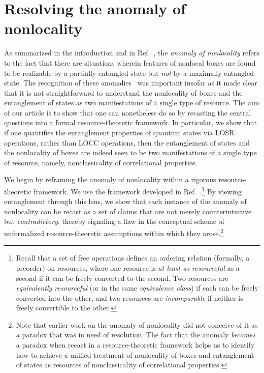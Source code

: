 \documentclass[12pt]{article}
\theoremstyle{plain}
\theoremstyle{definition}
\begin{document}
\section{Resolving the anomaly of nonlocality}\label{sec:anomalies}

As summarized in the introduction and in Ref.~\cite{Methot2006anomaly}, the {\em anomaly of nonlocality} refers to the fact that there are situations wherein features of nonlocal boxes are found to be realizable by a partially entangled state but {\em not} by a maximally entangled state. 
The recognition of these anomalies~\cite{Methot2006anomaly,AnomalyExtra2005Scarani,AnomalyExtra2008Brunner,vidick2011more,AnomalyExtra2011Junge,Acin2012randomnessvsnonlocality,AnomalyExtra2014Tan,AnomalyExtra2015Augusiak,AnomalyExtra2015Fonseca,AnomalyExtra2016Bowles,AnomalyExtra2017Kabel,AnomalyExtra2018Curchod,AnomalyExtra2018Bamps,AnomalyExtra2018Chitambar,AnomalyExtra2018Lipinska,AnomalyExtra2018Barasinski} was important insofar as it made clear that it is not straightforward to understand the nonlocality of boxes and the entanglement of states as two manifestations of a single type of resource.  The aim of our article is to show that one can nonetheless do so by recasting the central questions into a  formal resource-theoretic framework.  In particular, we show that if one quantifies the entanglement properties of quantum states via LOSR operations, rather than LOCC operations, then the entanglement of states and the nonlocality of boxes are indeed seen to be two manifestations of a single type of resource, namely, nonclassicality of correlational properties. 
  


We begin by reframing the anomaly of nonlocality within a rigorous resource-theoretic framework. 
We use the framework developed in Ref.~\cite{coecke2016mathematical}.\footnote{Recall that a set of free operations defines an ordering relation (formally, a preorder) on resources, where one resource is {\em at least as resourceful} as a second if it can be freely converted to the second. Two resources are {\em equivalently resourceful} (or in the same {\em equivalence class}) if each can be freely converted into the other, and two resources are {\em incomparable} 
 if neither is freely convertible to the other. } 
By viewing entanglement through this lens, we show that each instance of the anomaly of nonlocality can be recast as a set of claims that are not merely counterintuitive but {\em contradictory}, thereby signaling a flaw in the conceptual scheme of unformalized resource-theoretic assumptions within which they arose.\footnote{Note that earlier work on the anomaly of nonlocality did not conceive of it as a paradox that was in need of resolution.   The fact that the anomaly {\em becomes} a paradox when recast in a resource-theoretic framework helps us to identify how to achieve a unified treatment of nonlocality of boxes and entanglement of states as resources of nonclassicality of correlational properties.}
\end{document}
